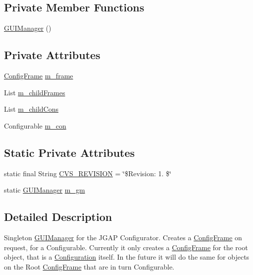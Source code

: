 \subsection*{Private Member Functions}
\begin{DoxyCompactItemize}
\item 
\hyperlink{classorg_1_1jgap_1_1gui_1_1_g_u_i_manager_ac944812d95ef7622a8fe7c2d0bf33fa2}{G\-U\-I\-Manager} ()
\end{DoxyCompactItemize}
\subsection*{Private Attributes}
\begin{DoxyCompactItemize}
\item 
\hyperlink{classorg_1_1jgap_1_1gui_1_1_config_frame}{Config\-Frame} \hyperlink{classorg_1_1jgap_1_1gui_1_1_g_u_i_manager_a6ae7de6827c208aab4ea850a14c5224f}{m\-\_\-frame}
\item 
List \hyperlink{classorg_1_1jgap_1_1gui_1_1_g_u_i_manager_a1eadb20bb511d8e744ebc1e6ba00c497}{m\-\_\-child\-Frames}
\item 
List \hyperlink{classorg_1_1jgap_1_1gui_1_1_g_u_i_manager_abff4e608e58f59b78ea559bc3d9f2481}{m\-\_\-child\-Cons}
\item 
Configurable \hyperlink{classorg_1_1jgap_1_1gui_1_1_g_u_i_manager_a552bbfdfec67903d2562b0dda5c1a106}{m\-\_\-con}
\end{DoxyCompactItemize}
\subsection*{Static Private Attributes}
\begin{DoxyCompactItemize}
\item 
static final String \hyperlink{classorg_1_1jgap_1_1gui_1_1_g_u_i_manager_abfdd0fd50f2f3956f6ba5d9058ed2c3d}{C\-V\-S\-\_\-\-R\-E\-V\-I\-S\-I\-O\-N} = \char`\"{}\$Revision\-: 1. \$\char`\"{}
\item 
static \hyperlink{classorg_1_1jgap_1_1gui_1_1_g_u_i_manager}{G\-U\-I\-Manager} \hyperlink{classorg_1_1jgap_1_1gui_1_1_g_u_i_manager_a9727b831aa2af09f9a7f5e1f52f2b746}{m\-\_\-gm}
\end{DoxyCompactItemize}


\subsection{Detailed Description}
Singleton \hyperlink{classorg_1_1jgap_1_1gui_1_1_g_u_i_manager}{G\-U\-I\-Manager} for the J\-G\-A\-P Configurator. Creates a \hyperlink{classorg_1_1jgap_1_1gui_1_1_config_frame}{Config\-Frame} on request, for a Configurable. Currently it only creates a \hyperlink{classorg_1_1jgap_1_1gui_1_1_config_frame}{Config\-Frame} for the root object, that is a \hyperlink{classorg_1_1jgap_1_1_configuration}{Configuration} itself. In the future it will do the same for objects on the Root \hyperlink{classorg_1_1jgap_1_1gui_1_1_config_frame}{Config\-Frame} that are in turn Configurable.

